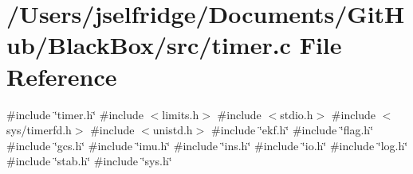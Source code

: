 \section{/\+Users/jselfridge/\+Documents/\+Git\+Hub/\+Black\+Box/src/timer.c File Reference}
\label{timer_8c}
{\ttfamily \#include \char`\"{}timer.\+h\char`\"{}}\newline
{\ttfamily \#include $<$limits.\+h$>$}\newline
{\ttfamily \#include $<$stdio.\+h$>$}\newline
{\ttfamily \#include $<$sys/timerfd.\+h$>$}\newline
{\ttfamily \#include $<$unistd.\+h$>$}\newline
{\ttfamily \#include \char`\"{}ekf.\+h\char`\"{}}\newline
{\ttfamily \#include \char`\"{}flag.\+h\char`\"{}}\newline
{\ttfamily \#include \char`\"{}gcs.\+h\char`\"{}}\newline
{\ttfamily \#include \char`\"{}imu.\+h\char`\"{}}\newline
{\ttfamily \#include \char`\"{}ins.\+h\char`\"{}}\newline
{\ttfamily \#include \char`\"{}io.\+h\char`\"{}}\newline
{\ttfamily \#include \char`\"{}log.\+h\char`\"{}}\newline
{\ttfamily \#include \char`\"{}stab.\+h\char`\"{}}\newline
{\ttfamily \#include \char`\"{}sys.\+h\char`\"{}}\newline
